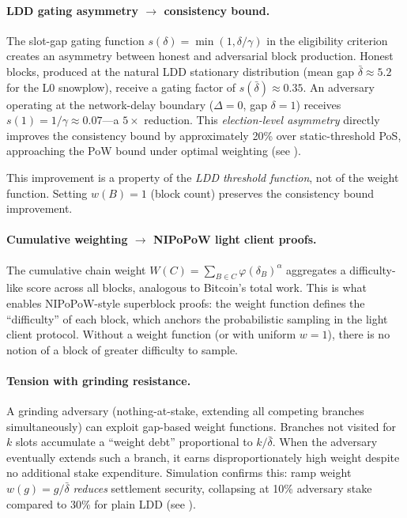 \documentclass[11pt]{article}
\begin{document}
\paragraph{LDD gating asymmetry $\to$ consistency bound.}
The slot-gap gating function $s(\delta) = \min(1, \delta/\gamma)$ in the eligibility criterion creates an asymmetry between honest and adversarial block production. Honest blocks, produced at the natural LDD stationary distribution (mean gap $\bar\delta \approx 5.2$ for the L0 snowplow), receive a gating factor of $s(\bar\delta) \approx 0.35$. An adversary operating at the network-delay boundary ($\Delta = 0$, gap $\delta = 1$) receives $s(1) = 1/\gamma \approx 0.07$---a $5\times$ reduction. This \emph{election-level asymmetry} directly improves the consistency bound by approximately 20\% over static-threshold PoS, approaching the PoW bound under optimal weighting (see ).

This improvement is a property of the \emph{LDD threshold function}, not of the weight function. Setting $w(B) = 1$ (block count) preserves the consistency bound improvement.

\paragraph{Cumulative weighting $\to$ NIPoPoW light client proofs.}
The cumulative chain weight $W(C) = \sum_{B \in C} \varphi(\delta_B)^\alpha$ aggregates a difficulty-like score across all blocks, analogous to Bitcoin's total work. This is what enables NIPoPoW-style superblock proofs: the weight function defines the ``difficulty'' of each block, which anchors the probabilistic sampling in the light client protocol. Without a weight function (or with uniform $w=1$), there is no notion of a block of greater difficulty to sample.

\paragraph{Tension with grinding resistance.}
A grinding adversary (nothing-at-stake, extending all competing branches simultaneously) can exploit gap-based weight functions. Branches not visited for $k$ slots accumulate a ``weight debt'' proportional to $k/\bar\delta$. When the adversary eventually extends such a branch, it earns disproportionately high weight despite no additional stake expenditure. Simulation confirms this: ramp weight $w(g) = g/\bar\delta$ \emph{reduces} settlement security, collapsing at 10\% adversary stake compared to 30\% for plain LDD (see ).
\end{document}
